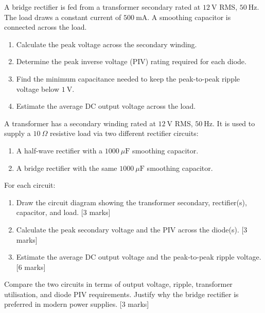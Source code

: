 \documentclass[11pt]{article}
\newcounter{popsec}
\newcounter{popsub}
\newcommand{\courssub}[1]{%
  \stepcounter{popsub}%
  \par\vspace{9pt}\noindent{\popxbold\fontsize{11.5}{13}\selectfont\color{popink}{\color{poporange}\thepopsec.\thepopsub}\hspace{6pt}#1}\par\nopagebreak\vspace{4pt}
}
\begin{document}
\begin{exercice}
A bridge rectifier is fed from a transformer secondary rated at $12\ \mathrm{V}$ RMS, $50\ \mathrm{Hz}$. The load draws a constant current of $500\ \mathrm{mA}$. A smoothing capacitor is connected across the load.
\begin{enumerate}
\item Calculate the peak voltage across the secondary winding.
\item Determine the peak inverse voltage (PIV) rating required for each diode.
\item Find the minimum capacitance needed to keep the peak-to-peak ripple voltage below $1\ \mathrm{V}$.
\item Estimate the average DC output voltage across the load.
\end{enumerate}
\end{exercice}

\courssub{I prepare for the GCE}

\begin{exercice}
A transformer has a secondary winding rated at $12\ \mathrm{V}$ RMS, $50\ \mathrm{Hz}$. It is used to supply a $10\ \Omega$ resistive load via two different rectifier circuits:
\begin{enumerate}
\item A half-wave rectifier with a $1000\ \mu\mathrm{F}$ smoothing capacitor.
\item A bridge rectifier with the same $1000\ \mu\mathrm{F}$ smoothing capacitor.
\end{enumerate}
For each circuit:
\begin{enumerate}
\item Draw the circuit diagram showing the transformer secondary, rectifier(s), capacitor, and load. [3 marks]
\item Calculate the peak secondary voltage and the PIV across the diode(s). [3 marks]
\item Estimate the average DC output voltage and the peak-to-peak ripple voltage. [6 marks]
\end{enumerate}
Compare the two circuits in terms of output voltage, ripple, transformer utilisation, and diode PIV requirements. Justify why the bridge rectifier is preferred in modern power supplies. [3 marks]
\end{exercice}
\end{document}
